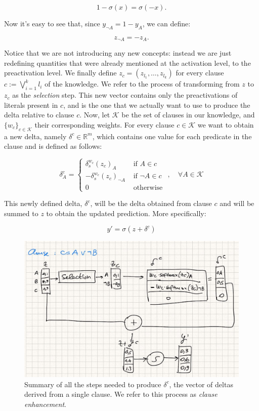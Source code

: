 \begin{equation*}
1 - \sigma(x) = \sigma(-x).
\end{equation*}

Now it's easy to see that, since $y_{\neg A} = 1 - y_A$, we can define:

\begin{equation*}
z_{\neg A} = -z_A.
\end{equation*}

Notice that we are not introducing any new concepts: instead we are just redefining quantities that were already mentioned at the activation level, to the preactivation level. %
We finally define $z_c = \left(z_{l_1}, \dots, z_{l_k}\right)$ for every clause $c := \bigvee_{i=1}^k l_i$ of the knowledge. We refer to the process of transforming from $z$ to $z_c$ as the \textit{selection} step. This new vector contains only the preactivations of literals present in $c$, and is the one that we actually want to use to produce the delta relative to clause $c$. Now, let $\mathcal{K}$ be the set of clauses in our knowledge, and $\{w_c\}_{c\in\mathcal{K}}$ their corresponding weights. For every clause $c\in \mathcal{K}$ we want to obtain a new delta, namely $\delta^c \in \mathbb{R}^m$, which contains one value for each predicate in the clause and is defined as follows:

\begin{equation}
\delta_{A}^{c}= \begin{cases}\delta_{s}^{w_{c}}\left(z_{c}\right)_{A} & \text { if } A \in c \\ -\delta_{s}^{w_{c}}\left(z_{c}\right)_{\neg A} & \text { if } \neg A \in c \\ 0 & \text { otherwise }\end{cases}, \quad \forall A \in \mathcal{K}
\label{eq:delta_c}
\end{equation}

This newly defined delta, $\delta^c$, will be the delta obtained from clause $c$ and will be summed to $z$ to obtain the updated prediction. More specifically:

$$y' = \sigma(z + \delta^c)$$

\begin{figure}[h!]
	\centering
	\includegraphics[width=0.8\linewidth]{figures/delta_single_clause.png}
	\caption{Summary of all the steps needed to produce $\delta^c$, the vector of deltas derived from a single clause. We refer to this process as \textit{clause enhancement}.}
	\label{fig:delta_single_clause}
\end{figure}


